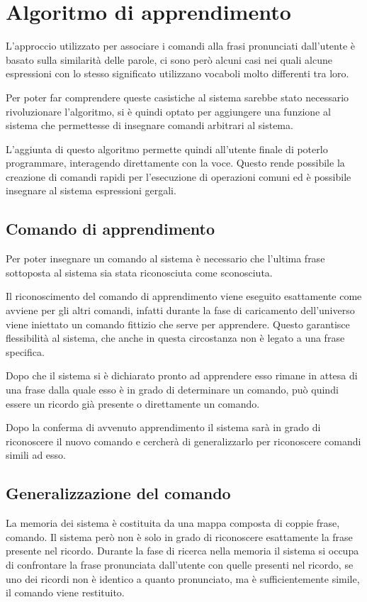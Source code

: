 \documentclass[twoside]{supsistudent}
\begin{document}
\chapter{Algoritmo di apprendimento}
L'approccio utilizzato per associare i comandi alla frasi pronunciati dall'utente è basato sulla similarità delle parole, ci sono però alcuni casi nei quali alcune espressioni con lo stesso significato utilizzano vocaboli molto differenti tra loro.

Per poter far comprendere queste casistiche al sistema sarebbe stato necessario rivoluzionare l'algoritmo, si è quindi optato per aggiungere una funzione al sistema che permettesse di insegnare comandi arbitrari al sistema.

L'aggiunta di questo algoritmo permette quindi all'utente finale di poterlo programmare, interagendo direttamente con la voce. Questo rende possibile la creazione di comandi rapidi per l'esecuzione di operazioni comuni ed è possibile insegnare al sistema espressioni gergali.
\section{Comando di apprendimento}
Per poter insegnare un comando al sistema è necessario che l'ultima frase sottoposta al sistema sia stata riconosciuta come sconosciuta. 

Il riconoscimento del comando di apprendimento viene eseguito esattamente come avviene per gli altri comandi, infatti durante la fase di caricamento dell'universo viene iniettato un comando fittizio che serve per apprendere. Questo garantisce flessibilità al sistema, che anche in questa circostanza non è legato a una frase specifica.

Dopo che il sistema si è dichiarato pronto ad apprendere esso rimane in attesa di una frase dalla quale esso è in grado di determinare un comando, può quindi essere un ricordo già presente o direttamente un comando.

Dopo la conferma di avvenuto apprendimento il sistema sarà in grado di riconoscere il nuovo comando e cercherà di generalizzarlo per riconoscere comandi simili ad esso.
\section{Generalizzazione del comando}
La memoria dei sistema è costituita da una mappa composta di coppie frase, comando. Il sistema però non è solo in grado di riconoscere esattamente la frase presente nel ricordo.
Durante la fase di ricerca nella memoria il sistema si occupa di confrontare la frase pronunciata dall'utente con quelle presenti nel ricordo, se uno dei ricordi non è identico a quanto pronunciato, ma è sufficientemente simile, il comando viene restituito.
\end{document}
